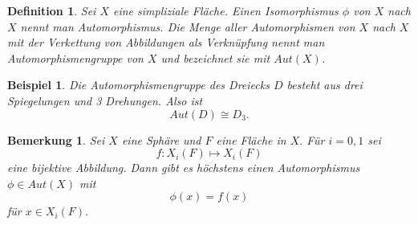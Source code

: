 \documentclass[12pt,titlepage,twoside,cleardoublepage]{article}
\theoremstyle{nummermitklammern}
\newtheorem{bsp}[temp]{Beispiel}
\newtheorem{definition}[temp]{Definition}
\newtheorem{bemerkung}[temp]{Bemerkung}
\newtheorem{definition}[zahl]{Definition}
\newtheorem{bsp}[zahl]{Beispiel}
\newtheorem{bemerkung}[zahl]{Bemerkung}
\numberwithin{equation}{section}
\begin{document}
\begin{definition}
Sei $X$ eine simpliziale Fläche. Einen Isomorphismus $\phi$ von
$X$ nach $X$ nennt man Automorphismus. Die Menge aller Automorphismen von $X$ nach $X$ mit der Verkettung von Abbildungen als Verknüpfung nennt man Automorphismengruppe von $X$ und bezeichnet sie mit $Aut(X)$. 
\end{definition}
\begin{bsp}
Die Automorphismengruppe des Dreiecks $D$ besteht aus drei 
Spiegelungen und 3 Drehungen. Also ist
\[
Aut(D)\cong D_3.
\]
\end{bsp}
\begin{bemerkung}
Sei $X$ eine Sphäre und $F$ eine Fläche in $X.$ Für $i=0,1$ sei 
\[
f:X_i(F)\mapsto X_i(F)  
\] 
eine bijektive Abbildung. Dann gibt es höchstens einen Automorphismus $\phi \in Aut(X)$ mit 
\[
\phi(x)=f(x) 
\]
für $x\in X_i(F).$
\end{bemerkung}
\end{document}
